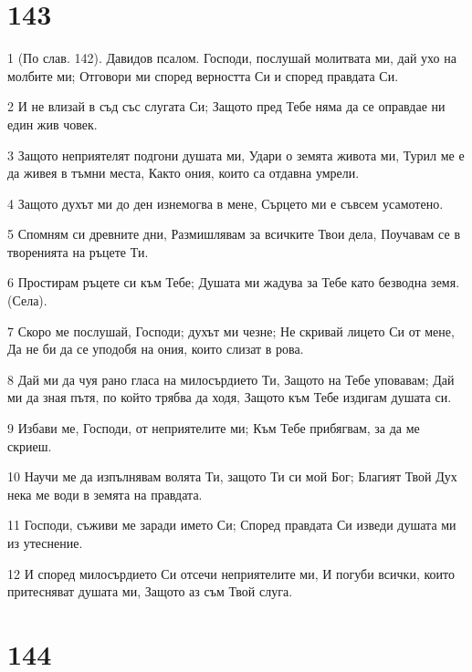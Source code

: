\chapter{143}

\par 1 (По слав. 142). Давидов псалом. Господи, послушай молитвата ми, дай ухо на молбите ми; Отговори ми според верността Си и според правдата Си.
\par 2 И не влизай в съд със слугата Си; Защото пред Тебе няма да се оправдае ни един жив човек.
\par 3 Защото неприятелят подгони душата ми, Удари о земята живота ми, Турил ме е да живея в тъмни места, Както ония, които са отдавна умрели.
\par 4 Защото духът ми до ден изнемогва в мене, Сърцето ми е съвсем усамотено.
\par 5 Спомням си древните дни, Размишлявам за всичките Твои дела, Поучавам се в творенията на ръцете Ти.
\par 6 Простирам ръцете си към Тебе; Душата ми жадува за Тебе като безводна земя. (Села).
\par 7 Скоро ме послушай, Господи; духът ми чезне; Не скривай лицето Си от мене, Да не би да се уподобя на ония, които слизат в рова.
\par 8 Дай ми да чуя рано гласа на милосърдието Ти, Защото на Тебе уповавам; Дай ми да зная пътя, по който трябва да ходя, Защото към Тебе издигам душата си.
\par 9 Избави ме, Господи, от неприятелите ми; Към Тебе прибягвам, за да ме скриеш.
\par 10 Научи ме да изпълнявам волята Ти, защото Ти си мой Бог; Благият Твой Дух нека ме води в земята на правдата.
\par 11 Господи, съживи ме заради името Си; Според правдата Си изведи душата ми из утеснение.
\par 12 И според милосърдието Си отсечи неприятелите ми, И погуби всички, които притесняват душата ми, Защото аз съм Твой слуга.

\chapter{144}


